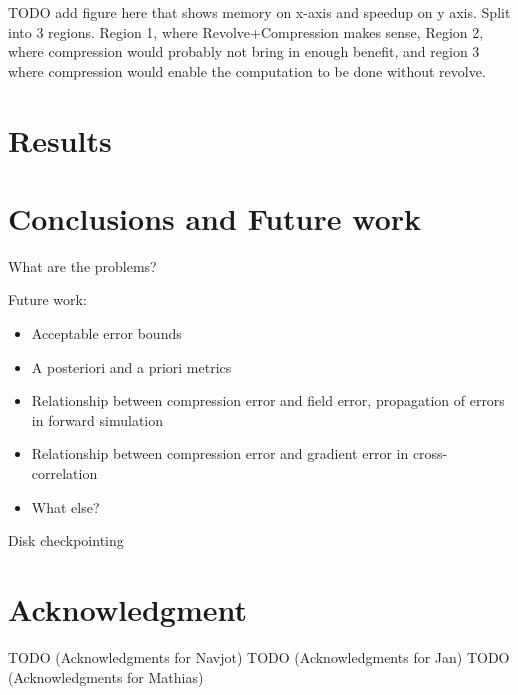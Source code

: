 \documentclass[conference]{IEEEtran}
\begin{document}
TODO add figure here that shows memory on x-axis and speedup on y axis. Split into 3 regions. Region 1, 
where Revolve+Compression makes sense, Region 2, where compression would probably not bring in enough benefit, 
and region 3 where compression would enable the computation to be done without revolve. 
\section{Results}


\section{Conclusions and Future work}

What are the problems?

Future work:
\begin{itemize}
\item Acceptable error bounds
\item A posteriori and a priori metrics
\item Relationship between compression error and field error, propagation of errors in forward simulation
\item Relationship between compression error and gradient error in cross-correlation
\item What else?
\end{itemize}

Disk checkpointing

\section*{Acknowledgment}

TODO (Acknowledgments for Navjot)
TODO (Acknowledgments for Jan)
TODO (Acknowledgments for Mathias)



\end{document}
